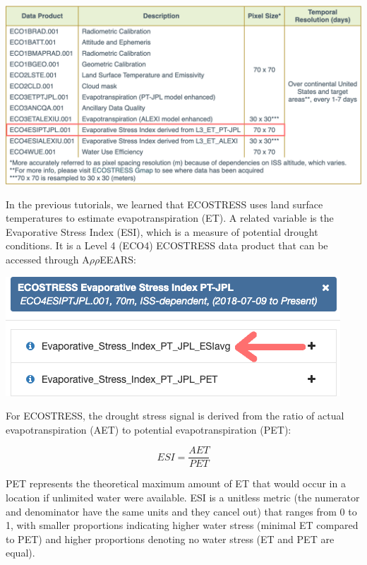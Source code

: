 \documentclass[oneside,a4paper,11pt,explicit]{book}
\begin{document}
\vspace{.5em}

\centerline{\includegraphics[width=.75\textwidth]{ECOSTRESS_DataProducts.png}}

\vspace{.5em}

In the previous tutorials, we learned that ECOSTRESS uses land surface temperatures to estimate evapotranspiration (ET). A related variable is the Evaporative Stress Index (ESI), which is a measure of potential drought conditions. It is a Level 4 (ECO4) ECOSTRESS data product that can be accessed through A$\rho\rho$EEARS:

\vspace{.5em}

\centerline{\includegraphics[width=.6\textwidth]{ESIecostress.png}}

\vspace{.5em}

For ECOSTRESS, the drought stress signal is derived from the ratio of actual evapotranspiration (AET) to potential evapotranspiration (PET):

\[
	ESI = \frac{AET}{PET}
\]

PET represents the theoretical maximum amount of ET that would occur in a location if unlimited water were available. ESI is a unitless metric (the numerator and denominator have the same units and they cancel out) that ranges from 0 to 1, with smaller proportions indicating higher water stress (minimal ET compared to PET) and higher proportions denoting no water stress (ET and PET are equal). 

\end{document}
